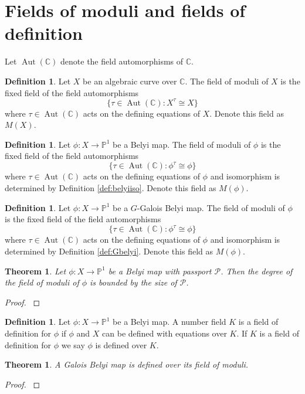 \documentclass{dcthesis}
\newcommand{\PP}{\mathbb P}
\newcommand{\CC}{\mathbb C}
\newcommand{\defi}[1]{\textsf{#1}}
\DeclareMathOperator{\Aut}{Aut}
\newtheorem{theorem}[prop]{Theorem}
\theoremstyle{definition}
\newtheorem{definition}[prop]{Definition}
\theoremstyle{remark}
\numberwithin{equation}{section}
\numberwithin{figure}{section}
\begin{document}
{  \section{Fields of moduli and fields of definition}{\label{sec:fieldsofmodulifieldsofdefinition}
    Let $\Aut(\CC)$ denote the field automorphisms of $\CC$.
    \begin{definition}
      \label{def:fieldofmoduli}
      Let $X$ be an algebraic curve over $\CC$.
      The \defi{field of moduli} of $X$ is the fixed field of the
      field automorphisms
      \[
        \{\tau\in\Aut(\CC) : X^\tau\cong X\}
      \]
      where $\tau\in\Aut(\CC)$ acts on the defining equations of $X$.
      Denote this field as $M(X)$.
    \end{definition}
    \begin{definition}
      \label{def:fieldofmodulibelyimap}
      Let $\phi\colon X\to\PP^1$ be a Belyi map.
      The \defi{field of moduli} of $\phi$ is the fixed field of the
      field automorphisms
      \[
        \{\tau\in\Aut(\CC) : \phi^\tau\cong \phi\}
      \]
      where $\tau\in\Aut(\CC)$ acts on the defining equations of $\phi$
      and isomorphism is determined by
      Definition \ref{def:belyiiso}.
      Denote this field as $M(\phi)$.
    \end{definition}
    \begin{definition}
      \label{def:fieldofmoduliGbelyimap}
      Let $\phi\colon X\to\PP^1$ be a $G$-Galois Belyi map.
      The \defi{field of moduli} of $\phi$ is the fixed field of the
      field automorphisms
      \[
        \{\tau\in\Aut(\CC) : \phi^\tau\cong \phi\}
      \]
      where $\tau\in\Aut(\CC)$ acts on the defining equations of $\phi$
      and isomorphism is determined by
      Definition \ref{def:Gbelyi}.
      Denote this field as $M(\phi)$.
    \end{definition}
    \begin{theorem}\label{thm:fieldofmoduli}
      Let $\phi:X\to\PP^1$ be a Belyi map
      with passport $\mathcal{P}$.
      Then the degree of the field of moduli of $\phi$
      is bounded by the size of $\mathcal{P}$.
    \end{theorem}
    \begin{proof}
      \cite{SV}
    \end{proof}
    \begin{definition}
      \label{def:fieldofdefinition}
      Let $\phi\colon X\to\PP^1$ be a Belyi map.
      A number field $K$ is a
      \defi{field of definition} for $\phi$
      if $\phi$ and $X$ can be defined
      with equations over $K$.
      If $K$ is a field of definition for $\phi$
      we say $\phi$ is \defi{defined over} $K$.
    \end{definition}
    \begin{theorem}
      \label{thm:galoisbelyimapoverfieldofmoduli}
      A Galois Belyi map is defined over
      its field of moduli.
    \end{theorem}
    \begin{proof}
      \cite[Lemma 4.1]{triangles}
    \end{proof}
  }
}
\end{document}
